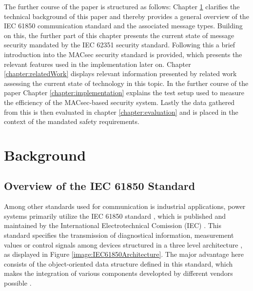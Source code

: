 \documentclass[conference, onecolumn, a4paper]{IEEEtran}
\begin{document}
\smallskip
The further course of the paper is structured as follows: Chapter \ref{chapter:fundamentals} clarifies the technical background of this paper and thereby 
provides a general overview of the IEC 61850 communication standard and the associated  message types. Building on this, the further part of this chapter 
presents the current state of message security mandated by the IEC 62351 security standard. Following this a brief introduction into the MACsec security 
standard is provided, which presents the relevant features used in the implementation later on. Chapter \ref{chapter:relatedWork} displays relevant 
information presented by related work assessing the current state of technology in this topic. In the further course of the paper Chapter 
\ref{chapter:implementation} explains the test setup used to measure the efficiency of the MACsec-based security system. Lastly the data gathered from 
this is then evaluated in chapter \ref{chapter:evaluation} and is placed in the context of the mandated safety requirements. 
\pagebreak
\section{Background}
\label{chapter:fundamentals}

\subsection{Overview of the IEC 61850 Standard}
\label{subchapter:IEC61850}
Among other standards used for communication is industrial applications, power systems primarily utilize the IEC 61850 standard \cite{IEC61850:2023}, 
which is published and maintained by the International Electrotechnical Comission (IEC) \cite{IEC61850_Overview:2006}. This standard specifies the 
transmission of diagnostical information, measurement values or control signals among devices structured in a three level architecture 
\cite{SGRWin_IEC61850Architecture:2021}, as displayed in Figure \ref{image:IEC61850Architecture}. The major advantage here consists of the object-oriented 
data structure defined in this standard, which makes the integration of various components developted by different vendors possible 
\cite[p. 5643]{Review_IEC62351:2019}. 
\end{document}
